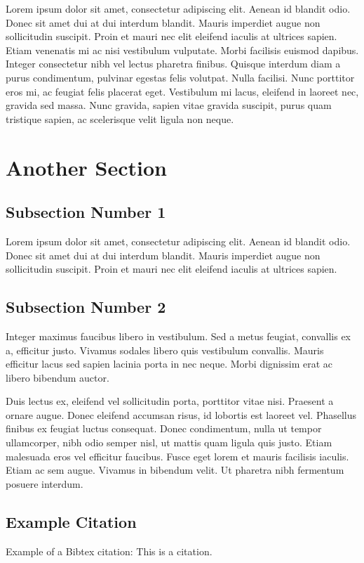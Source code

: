 \documentclass[11pt, a4paper]{article}
\begin{document}
Lorem ipsum dolor sit amet, consectetur adipiscing elit. Aenean id blandit odio. Donec sit amet dui at dui interdum blandit. Mauris imperdiet augue non sollicitudin suscipit. Proin et mauri nec elit eleifend iaculis at ultrices sapien. Etiam venenatis mi ac nisi vestibulum vulputate. Morbi facilisis euismod dapibus. Integer consectetur nibh vel lectus pharetra finibus. Quisque interdum diam a purus condimentum, pulvinar egestas felis volutpat. Nulla facilisi. Nunc porttitor eros mi, ac feugiat felis placerat eget. Vestibulum mi lacus, eleifend in laoreet nec, gravida sed massa. Nunc gravida, sapien vitae gravida suscipit, purus quam tristique sapien, ac scelerisque velit ligula non neque.

\section{Another Section}

\subsection{Subsection Number 1}
Lorem ipsum dolor sit amet, consectetur adipiscing elit. Aenean id blandit odio. Donec sit amet dui at dui interdum blandit. Mauris imperdiet augue non sollicitudin suscipit. Proin et mauri nec elit eleifend iaculis at ultrices sapien.
\subsection{Subsection Number 2}
Integer maximus faucibus libero in vestibulum. Sed a metus feugiat, convallis ex a, efficitur justo. Vivamus sodales libero quis vestibulum convallis. Mauris efficitur lacus sed sapien lacinia porta in nec neque. Morbi dignissim erat ac libero bibendum auctor.

Duis lectus ex, eleifend vel sollicitudin porta, porttitor vitae nisi. Praesent a ornare augue. Donec eleifend accumsan risus, id lobortis est laoreet vel. Phasellus finibus ex feugiat luctus consequat. Donec condimentum, nulla ut tempor ullamcorper, nibh odio semper nisl, ut mattis quam ligula quis justo. Etiam malesuada eros vel efficitur faucibus. Fusce eget lorem et mauris facilisis iaculis. Etiam ac sem augue. Vivamus in bibendum velit. Ut pharetra nibh fermentum posuere interdum.

\subsection{Example Citation}
Example of a Bibtex citation: This is a \cite{Jurafsky:Martin:09} citation.






\end{document}
